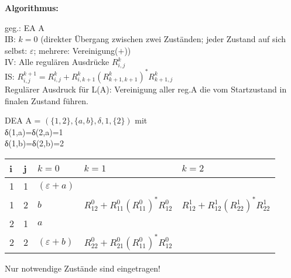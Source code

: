 \documentclass[11pt,
			a4paper,
			parskip=full,
			toc=bib,
			toc=idx,
			toc=listof,
			ngerman
			listof=totoc,]{scrartcl}
\newcommand{\concept}[1]{%
	\sf{%
		\textbf{%
				\textcolor{mymauve}{#1}%
		}%
	}%
	\rm%
}
\newenvironment{algo}[1]%
{	\begin{framed}
	\textbf{Algorithmus:} \concept{#1}}%
{\end{framed}}
\newenvironment{expl}%
{\color{red}}
{\color{black}}
\newcommand{\compress}{\vspace{-1em}}
\begin{document}
\compress
\compress
\begin{algo}{EA → RA (Zustandseliminationsverfahren)}

\compress
geg.: EA A\\
IB: $k=0$ (direkter Übergang zwischen zwei Zuständen; jeder Zustand auf sich selbst: $ε$; mehrere: Vereinigung($+$)) \\
IV: Alle regulären Ausdrücke $R_{i,j}^k$ \\
IS: $R_{i,j}^{k+1} = R_{i,j}^k + R_{i,k+1}^k(R_{k+1,k+1}^k)^*R_{k+1,j}^k$ \\
Regulärer Ausdruck für L(A): Vereinigung aller reg.A die vom Startzustand in finalen Zustand führen.
\end{algo}

\compress
\compress
\begin{expl}
\begin{minipage}[t]{1\linewidth}
  \begin{minipage}[t]{0.35\linewidth}

DEA A = $(\{1,2\},\{a,b\},δ,1,\{2\})$ mit \\
δ(1,a)=δ(2,a)=1 \\
δ(1,b)=δ(2,b)=2
   \end{minipage}
   \begin{minipage}[t]{0.6\linewidth}

\compress
\begin{tabular}{ |l l |l |l| l|}
\hline
i & j & $k=0$       & $k=1$                                       & $k=2$                                      \\
\hline              
1 & 1 & $(ε+a)$     &                                             &                                            \\
1 & 2 &   $b$       & $R_{12}^0 + R_{11}^0(R_{11}^0)^*R_{12}^0$   &  $R_{12}^1 + R_{12}^1(R_{22}^1)^*R_{22}^1$ \\
2 & 1 &   $a$       &                                             &                                            \\
2 & 2 & $(ε+b)$     & $R_{22}^0 + R_{21}^0(R_{11}^0)^*R_{12}^0$   &									 \\                  
\hline
\end{tabular}

Nur notwendige Zustände sind eingetragen!
 \end{minipage}
\end{minipage}
\end{expl}
\end{document}
